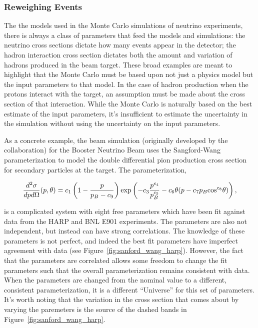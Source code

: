 \subsubsection{Reweighing Events}

The the models used in the Monte Carlo simulations of neutrino experiments, there is always a class of parameters that feed the models and simulations:  the neutrino cross sections dictate how many events appear in the detector; the hadron interaction cross section dictates both the amount and variation of hadrons produced in the beam target.  These broad examples are meant to highlight that the Monte Carlo must be based upon not just a physics model but the input parameters to that model.  In the case of hadron production when the protons interact with the target, an assumption must be made about the cross section of that interaction.  While the Monte Carlo is naturally based on the best estimate of the input parameters, it's insufficient to estimate the uncertainty in the simulation without using the uncertainty on the input parameters.

As a concrete example, the beam simulation (originally developed by the \MB collaboration) for the Booster Neutrino Beam uses the Sangford-Wang parameterization to model the double differential pion production cross section for secondary particles at the target.  The parameterization, 

\begin{equation}
\begin{centering}
\frac{d^2 \sigma}{dp d\Omega}(p,\theta) = c_1 \left(1 - \frac{p}{p_B - c_9}\right)\text{exp}\left(- c_3 \frac{p^{c_4}}{p^{c_5}_B} - c_6 \theta (p - c_7 p_B \text{cos}^{c_8}\theta) \right),
\end{centering}
\end{equation}

is a complicated system with eight free parameters which have been fit against data from the HARP and BNL E901 experiments.  The parameters are also not independent, but instead can have strong correlations.  The knowledge of these parameters is not perfect, and indeed the best fit parameters have imperfect agreement with data (see Figure~\ref{fig:sanford_wang_harp}).  However, the fact that the parameters are correlated allows some freedom to change the fit parameters such that the overall parameterization remains consistent with data.  When the parameters are changed from the nominal value to a different, consistent parameterization, it is a different ``Universe'' for this set of parameters.  It's worth noting that the variation in the cross section that comes about by varying the paremeters is the source of the dashed bands in Figure~\ref{fig:sanford_wang_harp}.

